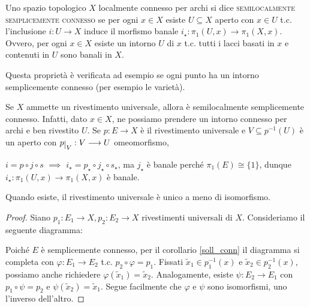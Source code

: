 \begin{defn}
  Uno spazio topologico $X$ localmente connesso per archi si dice \textsc{semilocalmente semplicemente connesso} se per ogni $x \in X$ esiste $U \subseteq X$ aperto con $x \in U$ t.c. l'inclusione $i:U \longrightarrow X$ induce il morfismo banale $i_{\star}:\pi_1(U, x) \longrightarrow \pi_1(X, x)$. Ovvero, per ogni $x \in X$ esiste un intorno $U$ di $x$ t.c. tutti i lacci basati in $x$ e contenuti in $U$ sono banali in $X$.
\end{defn}

Questa proprietà è verificata ad esempio se ogni punto ha un intorno semplicemente connesso (per esempio le varietà).

\begin{oss}
  Se $X$ ammette un rivestimento universale, allora è semilocalmente semplicemente connesso. Infatti, dato $x \in X$, ne possiamo prendere un intorno connesso per archi e ben rivestito $U$. Se $p:E \longrightarrow X$ è il rivestimento universale e $V \subseteq p^{-1}(U)$ è un aperto con $p\restrict{V}:V \longrightarrow U$ omeomorfismo,
  \begin{center}
  \end{center}
  $i=p \circ j \circ s$ $\implies$ $i_{\star}=p_{\star} \circ j_{\star} \circ s_{\star}$, ma $j_{\star}$ è banale perché $\pi_1(E) \cong \{1\}$, dunque $i_{\star}:\pi_1(U, x) \longrightarrow \pi_1(X, x)$ è banale.
\end{oss}

\begin{lm}
  Quando esiste, il rivestimento universale è unico a meno di isomorfismo.
\end{lm}

\begin{proof}
  Siano $p_1:E_1 \longrightarrow X, p_2:E_2 \longrightarrow X$ rivestimenti universali di $X$. Consideriamo il seguente diagramma:
  \begin{center}
  \end{center}
  Poiché $E$ è semplicemente connesso, per il corollario \ref{soll_conn} il diagramma si completa con $\varphi:E_1 \longrightarrow E_2$ t.c. $p_2 \circ \varphi=p_1$. Fissati $\tilde{x}_1 \in p_1^{-1}(x)$ e $\tilde{x}_2 \in p_2^{-1}(x)$, possiamo anche richiedere $\varphi(\tilde{x}_1)=\tilde{x}_2$.
  Analogamente, esiste $\psi:E_2 \longrightarrow E_1$ con $p_1 \circ \psi=p_2$ e $\psi(\tilde{x}_2)=\tilde{x}_1$. Segue facilmente che $\varphi$ e $\psi$ sono isomorfismi, uno l'inverso dell'altro.
\end{proof}

